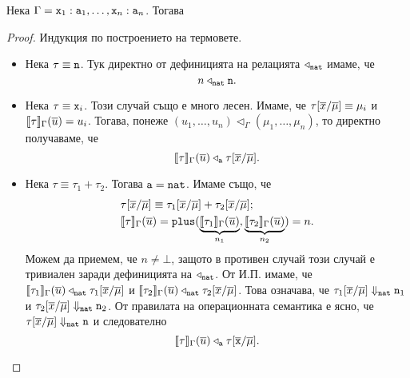 \begin{framed}
  \begin{lemma}\label{lem:pcf:fundamental}
    Нека $\Gamma = \vv{x}_1:\vv{a}_1,\dots,\vv{x}_n:\vv{a}_n$. Тогава
    \begin{prooftree}
    \end{prooftree}
  \end{lemma}  
\end{framed}
\begin{proof}
  Индукция по построението на термовете.
  \begin{itemize}
  \item
    Нека $\tau \equiv \vv{n}$. Тук директно от дефиницията на релацията $\triangleleft_{\vv{nat}}$ имаме, че
    \[n \triangleleft_{\vv{nat}} \vv{n}.\]
  \item
    Нека $\tau \equiv \vv{x}_i$. Този случай също е много лесен.
    Имаме, че $\tau[\ov{x}/\ov{\mu}] \equiv \mu_i$ и $\val{\tau}_\Gamma(\ov{u}) = u_i$.
    Тогава, понеже $(u_1,\dots,u_n) \triangleleft_\Gamma (\mu_1,\dots,\mu_n)$,
    то директно получаваме, че
    \[\val{\tau}_\Gamma(\ov{u}) \triangleleft_{\vv{a}} \tau[\ov{x}/\ov{\mu}].\]
  \item
    Нека $\tau \equiv \tau_1 + \tau_2$. Тогава $\vv{a} = \vv{nat}$. Имаме също, че
    \begin{align*}
      & \tau[\ov{x}/\ov{\mu}] \equiv \tau_1[\ov{x}/\ov{\mu}] + \tau_2[\ov{x}/\ov{\mu}];\\
      & \val{\tau}_\Gamma(\ov{u}) = \texttt{plus}(\underbrace{\val{\tau_1}_\Gamma(\ov{u})}_{n_1},\underbrace{\val{\tau_2}_\Gamma(\ov{u})}_{n_2}) = n.
    \end{align*}
    Можем да приемем, че $n \neq \bot$, защото в противен случай този случай е тривиален заради дефиницията на $\triangleleft_{\vv{nat}}$.
    От И.П. имаме, че $\val{\tau_1}_\Gamma(\ov{u}) \triangleleft_{\vv{nat}} \tau_1[\ov{x}/\ov{\mu}]$
    и $\val{\tau_2}_\Gamma(\ov{u}) \triangleleft_{\vv{nat}} \tau_2[\ov{x}/\ov{\mu}]$.
    Това означава, че $\tau_1[\ov{x}/\ov{\mu}] \Downarrow_{\vv{nat}} \vv{n}_1$ и $\tau_2[\ov{x}/\ov{\mu}] \Downarrow_{\vv{nat}}
    \vv{n}_2$.
    От правилата на операционната семантика е ясно, че $\tau[\ov{x}/\ov{\mu}] \Downarrow_{\vv{nat}} \vv{n}$ и следователно
    \[\val{\tau}_\Gamma(\ov{u}) \triangleleft_{\vv{a}} \tau[\ov{\vv{x}}/\ov{\mu}].\]

\end{itemize}
\end{proof}
